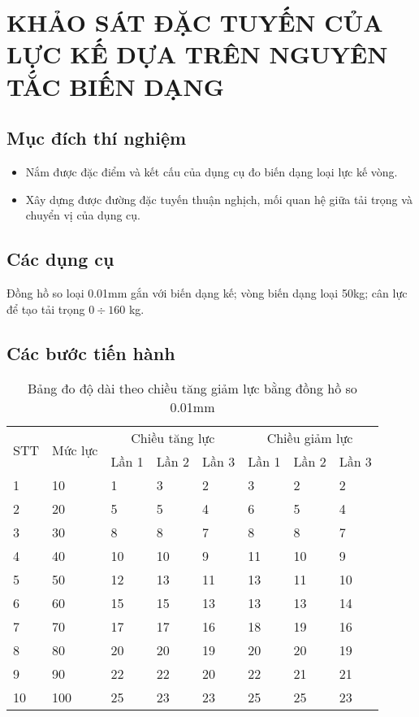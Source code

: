 \chapter{KHẢO SÁT ĐẶC TUYẾN CỦA LỰC KẾ DỰA TRÊN NGUYÊN TẮC BIẾN DẠNG}

\section{Mục đích thí nghiệm}
\begin{itemize}
	\item Nắm được đặc điểm và kết cấu của dụng cụ đo biến dạng loại lực kế vòng.
	\item Xây dựng được đường đặc tuyến thuận nghịch, mối quan hệ giữa tải trọng và chuyển vị của dụng cụ.
\end{itemize}

\section{Các dụng cụ}
Đồng hồ so loại 0.01mm gắn với biến dạng kế; vòng biến dạng loại 50kg; cân lực để tạo tải trọng $ 0\div 160 $ kg.

\section{Các bước tiến hành}

\begin{table}[ht]
	\centering
	\caption{Bảng đo độ dài theo chiều tăng giảm lực bằng đồng hồ so 0.01mm}
	\begin{tabular}{llllllll}\toprule
		\multirow{2}{*}{STT} & \multirow{2}{*}{Mức lực} & \multicolumn{3}{c}{Chiều tăng lực} & \multicolumn{3}{c}{Chiều giảm lực} \\\cmidrule(r{4pt}){3-5}\cmidrule(r{4pt}){6-8}
		& & Lần 1 & Lần 2 & Lần 3 &  Lần 1 & Lần 2 & Lần 3 \\\midrule
		1 & 10 & 1 & 3 & 2 & 3 & 2 & 2\\
		2 & 20 & 5 & 5 & 4 & 6 & 5 & 4\\
		3 & 30 & 8 & 8 & 7 & 8 & 8 & 7\\
		4 & 40 & 10 & 10 & 9 & 11 & 10 & 9 \\
		5 & 50 & 12 & 13 & 11 & 13 & 11 & 10\\
		6 & 60 & 15 & 15 & 13 & 13 & 13 & 14\\
		7 & 70 & 17 & 17 & 16 & 18 & 19 & 16\\
		8 & 80 & 20 & 20 & 19 & 20 & 20 & 19\\
		9 & 90 & 22 & 22 & 20 & 22 & 21 & 21\\
		10 & 100 & 25 & 23 & 23 & 25 & 25 & 23\\\bottomrule
	\end{tabular}
\end{table}

